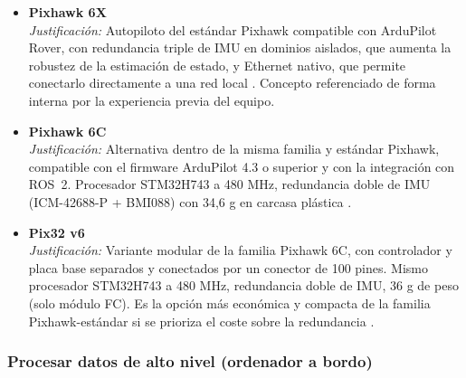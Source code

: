 \begin{itemize}

    \item \textbf{Pixhawk 6X} \\
    \textit{Justificación:} Autopiloto del estándar Pixhawk compatible con ArduPilot Rover, con redundancia 
    triple de IMU en dominios aislados, que aumenta la robustez de la estimación de estado, y Ethernet nativo, 
    que permite conectarlo directamente a una red local \cite{Cite14}. Concepto referenciado de forma interna por 
    la experiencia previa del equipo. \\

    \item \textbf{Pixhawk 6C} \\
    \textit{Justificación:} Alternativa dentro de la misma familia y estándar Pixhawk, compatible con el firmware 
    ArduPilot 4.3 o superior y con la integración con ROS~2. Procesador STM32H743 a 480 MHz, redundancia
    doble de IMU (ICM-42688-P + BMI088) con 34,6 g en carcasa plástica \cite{Cite14}. \\

    \item \textbf{Pix32 v6} \\
    \textit{Justificación:} Variante modular de la familia Pixhawk 6C, con controlador y placa
    base separados y conectados por un conector de 100 pines. Mismo procesador STM32H743
    a 480 MHz, redundancia doble de IMU, 36 g de peso (solo módulo
    FC). Es la opción más económica y compacta de la familia Pixhawk-estándar
    si se prioriza el coste sobre la redundancia \cite{Cite14} \cite{Cite15}. \\

\end{itemize}

\subsubsection*{Procesar datos de alto nivel (ordenador a bordo)}

